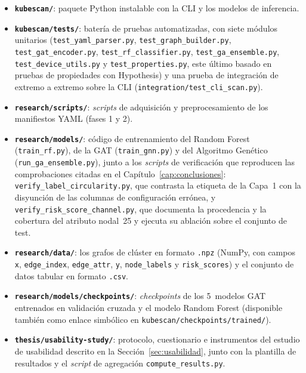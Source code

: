 \begin{itemize}
  \item \textbf{\texttt{kubescan/}}: paquete Python instalable con la \ac{CLI} y
    los modelos de inferencia.
  \item \textbf{\texttt{kubescan/tests/}}: batería de pruebas automatizadas, con
    siete módulos unitarios (\texttt{test\_yaml\_parser.py},
    \texttt{test\_graph\_builder.py}, \texttt{test\_gat\_encoder.py},
    \texttt{test\_rf\_classifier.py}, \texttt{test\_ga\_ensemble.py},
    \texttt{test\_device\_utils.py} y \texttt{test\_properties.py}, este último
    basado en pruebas de propiedades con Hypothesis) y una prueba de
    integración de extremo a extremo sobre la \ac{CLI}
    (\texttt{integration/test\_cli\_scan.py}).
  \item \textbf{\texttt{research/scripts/}}: \textit{scripts} de adquisición y
    preprocesamiento de los manifiestos \ac{YAML} (fases 1 y 2).
  \item \textbf{\texttt{research/models/}}: código de entrenamiento del Random
    Forest (\texttt{train\_rf.py}), de la \ac{GAT} (\texttt{train\_gnn.py}) y del
    Algoritmo Genético (\texttt{run\_ga\_ensemble.py}), junto a los \textit{scripts}
    de verificación que reproducen las comprobaciones citadas en el
    Capítulo~\ref{cap:conclusiones}: \texttt{verify\_label\_circularity.py}, que
    contrasta la etiqueta de la Capa~1 con la disyunción de las columnas de
    configuración errónea, y \texttt{verify\_risk\_score\_channel.py}, que documenta la
    procedencia y la cobertura del atributo nodal~25 y ejecuta su ablación sobre
    el conjunto de test.
  \item \textbf{\texttt{research/data/}}: los grafos de clúster en formato
    \texttt{.npz} (NumPy, con campos \texttt{x}, \texttt{edge\_index},
    \texttt{edge\_attr}, \texttt{y}, \texttt{node\_labels} y \texttt{risk\_scores})
    y el conjunto de datos tabular en formato \texttt{.csv}.
  \item \textbf{\texttt{research/models/checkpoints/}}: \textit{checkpoints}
    de los 5~modelos \ac{GAT} entrenados en validación cruzada y el modelo
    Random Forest (disponible también como enlace simbólico en
    \texttt{kubescan/checkpoints/trained/}).
  \item \textbf{\texttt{thesis/usability-study/}}: protocolo, cuestionario e
    instrumentos del estudio de usabilidad descrito en la
    Sección~\ref{sec:usabilidad}, junto con la plantilla de resultados y el
    \textit{script} de agregación \texttt{compute\_results.py}.

\end{itemize}
